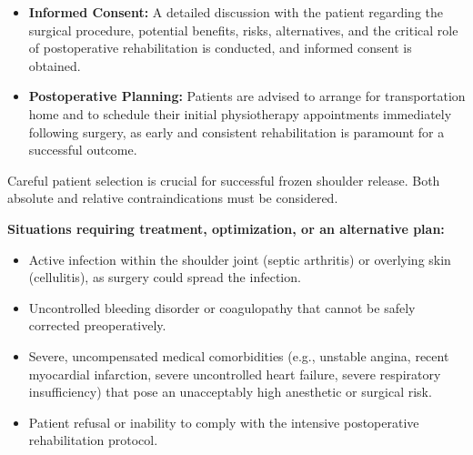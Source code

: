 \begin{itemize}
  \item \textbf{Informed Consent:} A detailed discussion with the patient regarding the surgical procedure, potential benefits, risks, alternatives, and the critical role of postoperative rehabilitation is conducted, and informed consent is obtained.
  
  \item \textbf{Postoperative Planning:} Patients are advised to arrange for transportation home and to schedule their initial physiotherapy appointments immediately following surgery, as early and consistent rehabilitation is paramount for a successful outcome.
\end{itemize}

Careful patient selection is crucial for successful frozen shoulder release. Both absolute and relative contraindications must be considered.

\textbf{Situations requiring treatment, optimization, or an alternative plan:}
\begin{itemize}
  \item Active infection within the shoulder joint (septic arthritis) or overlying skin (cellulitis), as surgery could spread the infection.
  
  \item Uncontrolled bleeding disorder or coagulopathy that cannot be safely corrected preoperatively.
  
  \item Severe, uncompensated medical comorbidities (e.g., unstable angina, recent myocardial infarction, severe uncontrolled heart failure, severe respiratory insufficiency) that pose an unacceptably high anesthetic or surgical risk.
  
  \item Patient refusal or inability to comply with the intensive postoperative rehabilitation protocol.
\end{itemize}

